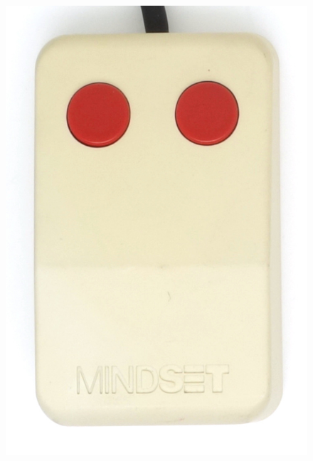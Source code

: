 \documentclass[11pt, a4paper]{article}
\begin{document}
\begin{figure}[h]
    \centering
    \includegraphics[scale=0.6]{1984_mindset_mouse/top_30.jpg}

\end{figure}
\end{document}
